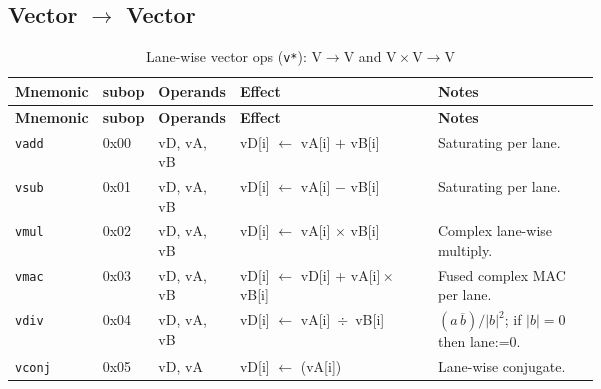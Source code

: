 \documentclass[10pt]{article}
\begin{document}
\subsection*{Vector $\to$ Vector}
\begin{longtable}{@{}l l l L{0.38\linewidth} L{0.30\linewidth}@{}}
\caption{Lane-wise vector ops (\texttt{v*}): $\mathrm{V}\to\mathrm{V}$ and $\mathrm{V}\times\mathrm{V}\to\mathrm{V}$}\label{tab:v_to_v}\\
\toprule
\textbf{Mnemonic} & \textbf{subop} & \textbf{Operands} & \textbf{Effect} & \textbf{Notes} \\
\midrule
\endfirsthead
\toprule
\textbf{Mnemonic} & \textbf{subop} & \textbf{Operands} & \textbf{Effect} & \textbf{Notes} \\
\midrule
\endhead
\texttt{vadd} & 0x00 & vD, vA, vB & vD[i] $\leftarrow$ vA[i] $+$ vB[i]                  & Saturating per lane. \\
\texttt{vsub} & 0x01 & vD, vA, vB & vD[i] $\leftarrow$ vA[i] $-$ vB[i]                  & Saturating per lane. \\
\texttt{vmul} & 0x02 & vD, vA, vB & vD[i] $\leftarrow$ vA[i] $\times$ vB[i]             & Complex lane-wise multiply. \\
\texttt{vmac} & 0x03 & vD, vA, vB & vD[i] $\leftarrow$ vD[i] + vA[i]\,$\times$\,vB[i]   & Fused complex MAC per lane. \\
\texttt{vdiv} & 0x04 & vD, vA, vB & vD[i] $\leftarrow$ vA[i] \,$\div$\, vB[i]           & $(a\,\overline{b})/|b|^2$; if $|b|{=}0$ then lane:=0. \\
\texttt{vconj} & 0x05 & vD, vA     & vD[i] $\leftarrow$ (vA[i])             & Lane-wise conjugate. \\
\bottomrule
\end{longtable}

\end{document}
